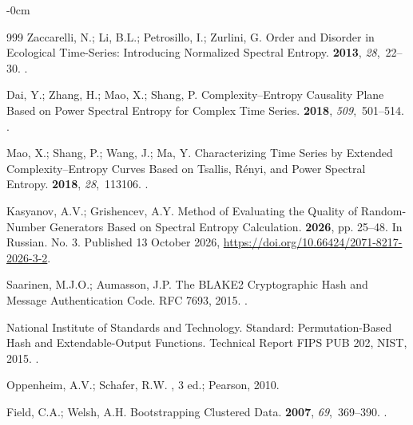 \documentclass[electronics,article,submit,pdftex,oneauthor]{Definitions/mdpi}
\begin{document}
\begin{adjustwidth}{-\extralength}{0cm}
\begin{thebibliography}{999}
Zaccarelli, N.; Li, B.L.; Petrosillo, I.; Zurlini, G.
\newblock Order and Disorder in Ecological Time-Series: Introducing Normalized
  Spectral Entropy.
 {\bf 2013}, {\em 28},~22--30.
.

Dai, Y.; Zhang, H.; Mao, X.; Shang, P.
\newblock Complexity--Entropy Causality Plane Based on Power Spectral Entropy
  for Complex Time Series.
 {\bf
  2018}, {\em 509},~501--514.
.

Mao, X.; Shang, P.; Wang, J.; Ma, Y.
\newblock Characterizing Time Series by Extended Complexity--Entropy Curves
  Based on {Tsallis}, {R{\'e}nyi}, and Power Spectral Entropy.
 {\bf
  2018}, {\em 28},~113106.
.

Kasyanov, A.V.; Grishencev, A.Y.
\newblock Method of Evaluating the Quality of Random-Number Generators Based on
  Spectral Entropy Calculation.
 {\bf 2026},
  pp. 25--48.
\newblock In Russian. No. 3. Published 13 October 2026,
  {\url{https://doi.org/10.66424/2071-8217-2026-3-2}}.

Saarinen, M.J.O.; Aumasson, J.P.
\newblock The {BLAKE2} Cryptographic Hash and Message Authentication Code.
\newblock RFC 7693,  2015.
.

{National Institute of Standards and Technology}.
 Standard: Permutation-Based Hash and Extendable-Output
  Functions.
\newblock Technical Report FIPS PUB 202, NIST,  2015.
.

Oppenheim, A.V.; Schafer, R.W.
, 3 ed.; Pearson,  2010.

Field, C.A.; Welsh, A.H.
\newblock Bootstrapping Clustered Data.
 {\bf 2007},
  {\em 69},~369--390.
.


\end{thebibliography}
\end{adjustwidth}
\end{document}
